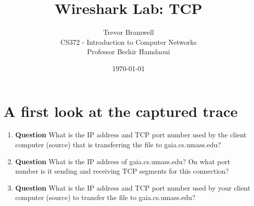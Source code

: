 \documentclass[12pt,letterpaper]{article}
\title{Wireshark Lab: TCP}
\author{
    Trevor Bramwell \\
    CS372 - Introduction to Computer Networks \\
    Professor Bechir Hamdaoui
}
\date{\today}
\newcommand{\q}{\textbf{Question} }
\begin{document}
\maketitle

\setcounter{section}{1}
\section{A first look at the captured trace}
\begin{enumerate}
\item \q What is the IP address and TCP port number used by the client computer
(source) that is transferring the file to gaia.cs.umass.edu? 

\item \q What is the IP address of gaia.cs.umass.edu? On what port number is it
sending and receiving TCP segments for this connection?

\item \q What is the IP address and TCP port number used by your client computer
(source) to transfer the file to gaia.cs.umass.edu?  
\end{enumerate}

\pagebreak
\end{document}
